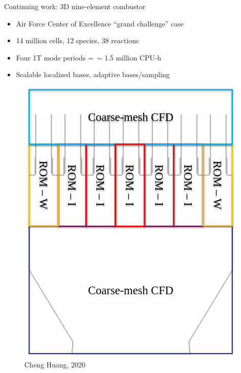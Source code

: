 \documentclass[]{beamer}
\begin{document}
\begin{frame}{Continuing work: 3D nine-element combustor\footnotemark[17]}
	\begin{itemize}
		\item Air Force Center of Excellence ``grand challenge'' case
		\item 14 million cells, 12 species, 38 reactions
		\item Four 1T mode periods =$~\sim$1.5 million CPU-h
		\item Scalable localized bases, adaptive bases/sampling
	\end{itemize}
	\begin{minipage}{0.45\linewidth}
		\begin{figure}
		\end{figure}
	\end{minipage}
	\begin{minipage}{0.53\linewidth}
		\centering
		\begin{figure}
			\includegraphics[width=0.55\linewidth]{experiments/9elem/multicomponent.png}
			\caption*{\tiny{Cheng Huang, 2020}}
		\end{figure}
		\vspace{-3em}
	\end{minipage}
\end{frame}
\end{document}
